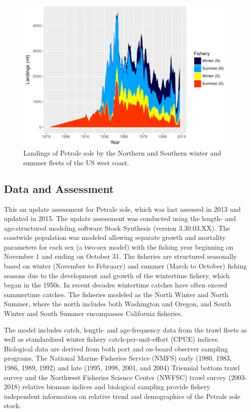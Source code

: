 \documentclass[12pt,]{article}
\begin{document}
\FloatBarrier

\begin{figure}[htbp]
\centering
\includegraphics{Petrale_2019_Update_files/figure-latex/unnamed-chunk-13-1.pdf}
\caption{Landings of Petrale sole by the Northern and Southern winter
and summer fleets of the US west coast. \label{fig:Exec_catch1}}
\end{figure}

\FloatBarrier

\subsection*{Data and Assessment}\label{data-and-assessment}

This an update assessment for Petrale sole, which was last assessed in
2013 and updated in 2015. The update assessment was conducted using the
length- and age-structured modeling software Stock Synthesis (version
3.30.03.XX). The coastwide population was modeled allowing separate
growth and mortality parameters for each sex (a two-sex model) with the
fishing year beginning on November 1 and ending on October 31. The
fisheries are structured seasonally based on winter (November to
February) and summer (March to October) fishing seasons due to the
development and growth of the wintertime fishery, which began in the
1950s. In recent decades wintertime catches have often exceed summertime
catches. The fisheries modeled as the North Winter and North Summer,
where the north includes both Washington and Oregon, and South Winter
and South Summer encompasses California fisheries.

The model includes catch, length- and age-frequency data from the trawl
fleets as well as standardized winter fishery catch-per-unit-effort
(CPUE) indices. Biological data are derived from both port and on-board
observer sampling programs. The National Marine Fisheries Service (NMFS)
early (1980, 1983, 1986, 1989, 1992) and late (1995, 1998, 2001, and
2004) Triennial bottom trawl survey and the Northwest Fisheries Science
Center (NWFSC) trawl survey (2003-2018) relative biomass indices and
biological sampling provide fishery independent information on relative
trend and demographics of the Petrale sole stock.
\end{document}
